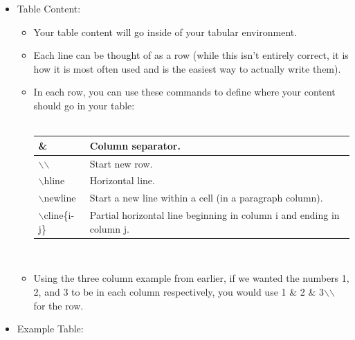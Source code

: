 \begin{itemize}
\begin{itemize}
					\item Tables in \LaTeX{} will not automatically wrap text in calls and will overrun the width of the page if long enough. For these columns that will contain long texts, it is recommended to use a paragraph column.
					\begin{itemize}
						\item To specify length of a paragraph column, you would include it using \{enter length here\}.
						\item Specifying a p column with a size of 5cm will look like this: p\{5cm\}
					\end{itemize}
				\end{itemize}
				\item Table Content:
				\begin{itemize}
					\item Your table content will go inside of your tabular environment.
					\item Each line can be thought of as a row (while this isn\rq{}t entirely correct, it is how it is most often used and is the easiest way to actually write them).
					\item In each row, you can use these commands to define where your content should go in your table:\\\\
					\def\arraystretch{1.4}
					\begin{tabularx}{\textwidth}{| l | X |}
						\hline
						\& & Column separator.\\
						\hline
						$\backslash$$\backslash$ & Start new row.\\
						\hline
						$\backslash$hline & Horizontal line.\\
						\hline
						$\backslash$newline & Start a new line within a cell (in a paragraph column).\\
						\hline
						$\backslash$cline\{i-j\} & Partial horizontal line beginning in column i and ending in column j.\\
						\hline
					\end{tabularx}\\
					\item Using the three column example from earlier, if we wanted the numbers 1, 2, and 3 to be in each column respectively, you would use 1 \& 2 \& 3$\backslash$$\backslash$ for the row.
				\end{itemize}
				\item  Example Table:\\\\

\end{itemize}
